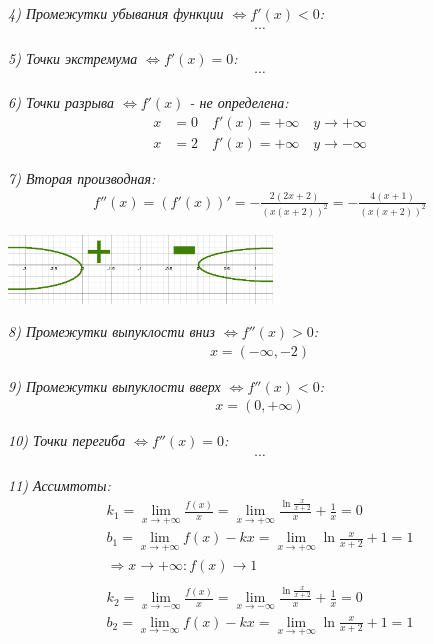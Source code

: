 \documentclass[a4paper,11pt]{article}
\begin{document}
\noindent \textsl{4) Промежутки убывания функции   $\Longleftrightarrow f'(x) < 0 $:}
\begin{gather*}
\cdots
\end{gather*}

\noindent \textsl{5) Точки экстремума   $\Longleftrightarrow f'(x) = 0 $:}
\begin{align*}
\cdots
\end{align*}

\noindent \textsl{6) Точки разрыва $ \Longleftrightarrow f'(x) $  - не определена:}
\begin{align*}
	x &= 0 \quad f'(x) = +\infty \quad y \rightarrow +\infty\\
	x &= 2 \quad f'(x) = +\infty \quad y \rightarrow -\infty
\end{align*}

\noindent \textsl{7) Вторая производная:}
\begin{gather*}	
f''(x) = (f'(x))' = -\frac{2(2x + 2)}{(x(x + 2))^2} = -\frac{4(x + 1)}{(x(x + 2))^2}
\end{gather*}


\begin{center}
	\includegraphics[width = 70mm]{images/83.png}
\end{center}
\noindent \textsl{8) Промежутки  выпуклости вниз $\Longleftrightarrow f''(x) > 0 $:}
\begin{gather*}
x = (-\infty, -2)
\end{gather*}

\noindent \textsl{9) Промежутки  выпуклости вверх $\Longleftrightarrow f''(x) < 0 $:}
\begin{gather*}
x = (0, +\infty)
\end{gather*}

\noindent \textsl{10) Точки перегиба   $\Longleftrightarrow f''(x) = 0 $:}
\begin{align*}
 \cdots
\end{align*}

\noindent \textsl{11) Ассимтоты:}
\begin{gather*}
k_1 = \lim_{x \to +\infty} \frac{f(x)}{x} = \lim_{x \to +\infty} \frac{\ln \frac{x}{x + 2}}{x} + \frac{1}{x} = 0 \\
b_1 = \lim_{x \to +\infty} f(x) - kx = \lim_{x \to +\infty} \ln \frac{x}{x + 2} + 1 = 1 \\
\Rightarrow x \to +\infty: f(x) \to 1 \\ \\
k_2 = \lim_{x \to -\infty} \frac{f(x)}{x} = \lim_{x \to -\infty} \frac{\ln \frac{x}{x + 2}}{x} + \frac{1}{x} = 0 \\
b_2 = \lim_{x \to -\infty} f(x) - kx = \lim_{x \to +\infty} \ln \frac{x}{x + 2} + 1 = 1 \\
\end{gather*}
\newpage
\end{document}
